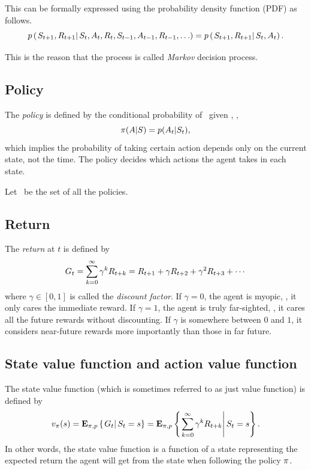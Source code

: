 This can be formally expressed using the probability density function (PDF)
as follows.
\begin{equation}
p\left(\left.S_{t+1}, R_{t+1} \right| S_{t}, A_{t}, R_{t}, S_{t-1}, A_{t-1}, R_{t-1}, \ldots\right)
= p\left(\left.S_{t+1}, R_{t+1} \right| S_{t}, A_{t} \right).
\end{equation}

This is the reason that the process is called \emph{Markov} decision process.

\subsection{Policy}

The \emph{policy} is defined by the conditional probability of \ given ,
\ie,
\begin{equation}
\pi(A|S) = p(A_t|S_{t}),
\end{equation}
which implies the probability of taking certain action depends only on the current state, not the time.
The policy decides which actions the agent takes in each state.

Let \polset\ be the set of all the policies.

\subsection{Return}

The \emph{return} at $t$ is defined by
\begin{equation}
        G_t
        = \sum_{k=0}^\infty \gamma^k R_{t+k}
        = R_{t+1} + \gamma R_{t+2} + \gamma^2 R_{t+3} + \cdots
\end{equation}
where $\gamma \in [0,1]$ is called the \emph{discount factor}.
If $\gamma=0$, the agent is myopic, \ie, it only cares the immediate reward.
If $\gamma=1$, the agent is truly far-sighted, \ie, it cares all the future rewards without discounting.
If $\gamma$ is somewhere between $0$ and $1$, it considers near-future rewards more importantly than those in far future.


\subsection{State value function and action value function}

The state value function (which is sometimes referred to as just value function) is defined by
\begin{equation}
v_{\pi}(s)
= \mathbf{E}_{\pi,p} \left\{\left.G_{t}\right|S_{t} = s\right\}
= \mathbf{E}_{\pi,p} \left\{\left.
    \sum_{k=0}^\infty \gamma^k R_{t+k}
    \right|S_{t} = s\right\}.
\end{equation}
In other words, the state value function is a function of a state
representing the expected return the agent will get from the state
when following the policy $\pi$.

